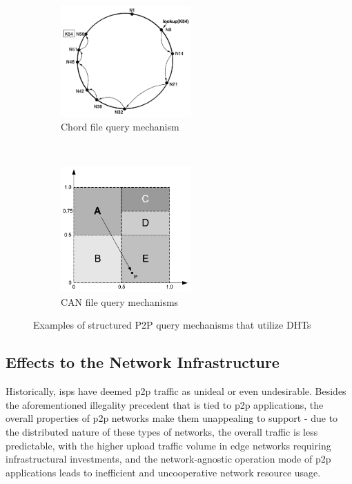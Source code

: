 \begin{figure}[t!h]
    \centering
    \begin{subfigure}[t]{0.4\textwidth}
    \centering
    \includegraphics[width=5cm]{img/chord-lookup.png}
    \caption{Chord file query mechanism \cite{stoica2003}}    
    \label{fig:chord}
    \end{subfigure}
    ~
    \begin{subfigure}[t]{0.4\textwidth}
    \centering
    \includegraphics[width=5cm]{img/can-lookup.png}
    \caption{CAN file query mechanisms \cite{p2p-survey-1}}
    \label{fig:can} 
    \end{subfigure}

\caption{Examples of structured P2P query mechanisms that utilize DHTs}
\label{fig:dht-usage}
\end{figure}

\subsection{Effects to the Network Infrastructure}

\label{ssec:p2p-effects}

    Historically, \glspl{isp} have deemed \gls{p2p} traffic as unideal or even undesirable.
    Besides the aforementioned illegality precedent that is tied to \gls{p2p} applications, the overall properties of \gls{p2p} networks make them unappealing to support - due to the distributed nature of these types of networks, the overall traffic is less predictable, with the higher upload traffic volume in edge networks requiring infrastructural investments, and the network-agnostic operation mode of \gls{p2p} applications leads to inefficient and uncooperative network resource usage.

